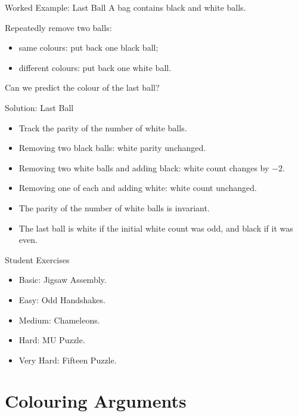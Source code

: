 \documentclass{beamer}
\begin{document}
\begin{frame}{Worked Example: Last Ball}
    A bag contains black and white balls.

    Repeatedly remove two balls:
    \begin{itemize}
        \item<1-> same colours: put back one black ball;
        \item<1-> different colours: put back one white ball.
    \end{itemize}

    Can we predict the colour of the last ball?
\end{frame}

\begin{frame}{Solution: Last Ball}
    \pause
    \begin{itemize}
        \item Track the parity of the number of white balls.
        \item Removing two black balls: white parity unchanged.
        \item Removing two white balls and adding black: white count
            changes by $-2$.
        \item Removing one of each and adding white: white count unchanged.
        \item The parity of the number of white balls is invariant.
        \item The last ball is white if the initial white count was odd,
            and black if it was even.
    \end{itemize}

\end{frame}

\begin{frame}{Student Exercises}
    \begin{itemize}
        \item<1-> Basic: Jigsaw Assembly.
        \item<1-> Easy: Odd Handshakes.
        \item<1-> Medium: Chameleons.
        \item<1-> Hard: MU Puzzle.
        \item<1-> Very Hard: Fifteen Puzzle.
    \end{itemize}
\end{frame}

\section{Colouring Arguments}
\end{document}

